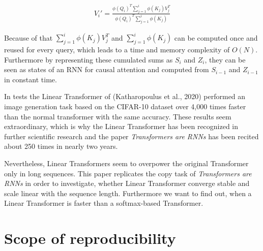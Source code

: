 \documentclass[DIV=13,fontsize=11pt]{scrartcl}
\begin{document}
\begin{align}
    V_{i}' {=} \frac{\phi(Q_{i})^T \sum_{j=1}^{i} \phi(K_{j})V_{j}^T}{\phi(Q_{i})^T \sum_{j=1}^{i}\phi(K_{j})}
\end{align}

Because of that \(\sum_{j=1}^{i} \phi(K_{j})V_{j}^T\) and \(\sum_{j=1}^{i}\phi(K_{j})\) can be computed once and reused for every query, which leads to a time and memory complexity of \(O(N)\). Furthermore by representing these cumulated sums as \(S_{i}\) and \(Z_{i}\), they can be seen as states of an RNN for causal attention and computed from \(S_{i-1}\) and \(Z_{i-1}\) in constant time.

In tests the Linear Transformer of (Katharopoulus et al., 2020) performed an image generation task based on the CIFAR-10 dataset over 4,000 times faster than the normal transformer with the same accuracy.  These results seem extraordinary, which is why the Linear Transformer has been recognized in further scientific research and the paper \textit{Transformers are RNNs} has been recited about 250 times in nearly two years. 

Nevertheless, Linear Transformers seem to overpower the original Transformer only in long sequences. This paper replicates the copy task of \textit{Transformers are RNNs} in order to investigate, whether Linear Transformer converge stable and scale linear with the sequence length. Furthermore we want to find out, when a Linear Transformer is faster than a softmax-based Transformer.




\section{Scope of reproducibility}
    
\end{document}
